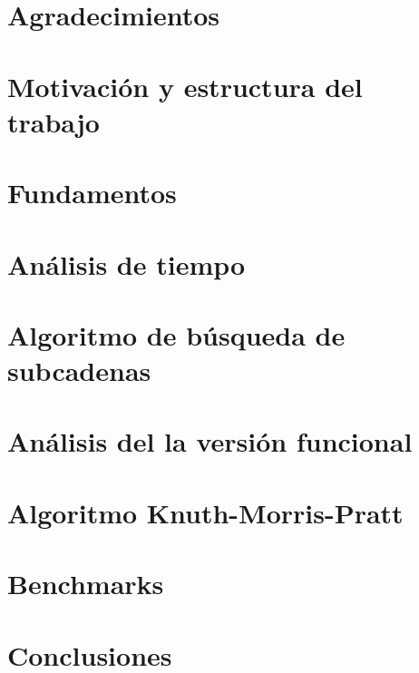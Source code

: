 \documentclass{book}
\begin{document}
\thispagestyle{empty}
\frontmatter
    
    \clearpage
    \mbox{}
    \clearpage
    \thispagestyle{empty}
    
    
    
    \chapter*{Agradecimientos}
    
    \clearpage
    
    \tableofcontents


\mainmatter
    \chapter*{Motivación y estructura del trabajo}
        
    
    \chapter{Fundamentos}
        
    
    \chapter{Análisis de tiempo}
        
    
    \chapter{Algoritmo de búsqueda de subcadenas}
        
    
    \chapter{Análisis del la versión funcional}
        
    
    \chapter{Algoritmo Knuth-Morris-Pratt}
        
    
    \chapter{Benchmarks}
        

    \chapter{Conclusiones}
        
    


\backmatter
    \nocite{*}
    \printbibliography
\end{document}
